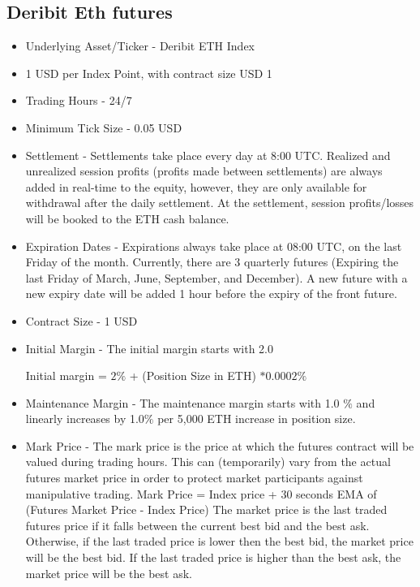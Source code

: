 \subsection{Deribit Eth futures \cite{fut}}
\begin{itemize}


\item Underlying Asset/Ticker - Deribit ETH Index

\item 1 USD per Index Point, with contract size USD 1

\item Trading Hours - 24/7

\item Minimum Tick Size - 0.05 USD

\item Settlement - Settlements take place every day at 8:00 UTC. Realized and unrealized session profits (profits made between settlements) are always added in real-time to the equity, however, they are only available for withdrawal after the daily settlement. At the settlement, session profits/losses will be booked to the ETH cash balance.

\item Expiration Dates - Expirations always take place at 08:00 UTC, on the last Friday of the month. Currently, there are 3 quarterly futures (Expiring the last Friday of March, June, September, and December). A new future with a new expiry date will be added 1 hour before the expiry of the front future.

\item Contract Size - 1 USD

\item Initial Margin - 
The initial margin starts with 2.0%

Initial margin = $2\%$ + (Position Size in ETH) $* 0.0002\%$

\item Maintenance Margin - 
The maintenance margin starts with 1.0 $\%$ and linearly increases by 1.0$\%$ per 5,000 ETH increase in position size.

\item Mark Price - 
The mark price is the price at which the futures contract will be valued during trading hours. This can (temporarily) vary from the actual futures market price in order to protect market participants against manipulative trading.
Mark Price = Index price + 30 seconds EMA of (Futures Market Price - Index Price)
The market price is the last traded futures price if it falls between the current best bid and the best ask.  
Otherwise, if the last traded price is lower then the best bid, the market price will be the best bid. If the last traded price is higher than the best ask, the market price will be the best ask.


\end{itemize}
